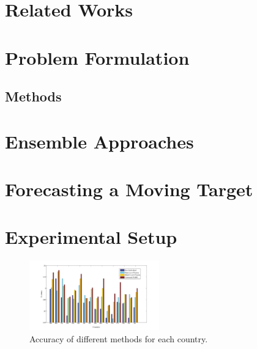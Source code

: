 \documentclass[twoside,leqno,twocolumn]{article}
\begin{document}
\vspace{-1em}
\section{\label{sec:related}Related Works}


\vspace{-1em}
\section{\label{sec:problem} Problem Formulation}

 
\subsection{\label{sec:methods} Methods}


\vspace{-1em}
\section{\label{sec:ensemble} Ensemble Approaches}


\vspace{-1em}
\section{\label{sec:moving} Forecasting a Moving Target}


\vspace{-1em}
\section{\label{sec:experiments} Experimental Setup}


\begin{figure}[H]
\centering
\captionsetup{font=scriptsize}
\includegraphics[width=0.5\textwidth]{fig/accs}
\vspace{-1em}
\caption{Accuracy of different methods for each country.}
\label{fig:accuracies}
\vspace{-1em}
\end{figure}
\end{document}
